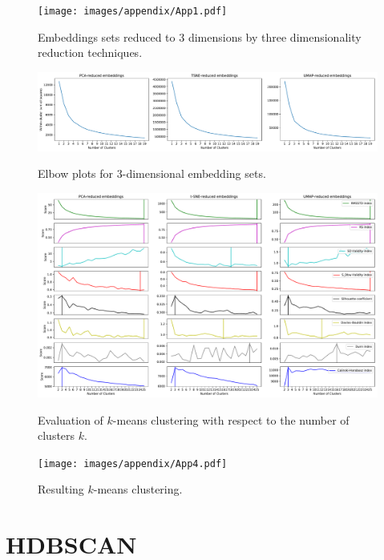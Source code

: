 \begin{figure}[!ht]
	\centering
	\texttt{[image: images/appendix/App1.pdf]}\\
	\caption{Embeddings sets reduced to 3 dimensions by three dimensionality reduction techniques.}
	\label{fig:App1}
\end{figure}
\begin{figure}[!ht]
	\centering
	\includegraphics[width=1.0\textwidth]{images/appendix/App2.pdf}\\
	\caption{Elbow plots for 3-dimensional embedding sets.}
	\label{fig:App2}
\end{figure}
\begin{figure}[!ht]
	\centering
	\includegraphics[width=1.0\textwidth]{images/appendix/App3.pdf}\\
	\caption{Evaluation of $k$-means clustering with respect to the number of clusters $k$.}
	\label{fig:App3}
\end{figure}
\begin{figure}[!ht]
	\centering
	\texttt{[image: images/appendix/App4.pdf]}\\
	\caption{Resulting $k$-means clustering.}
	\label{fig:App4}
\end{figure}

\section{HDBSCAN}

